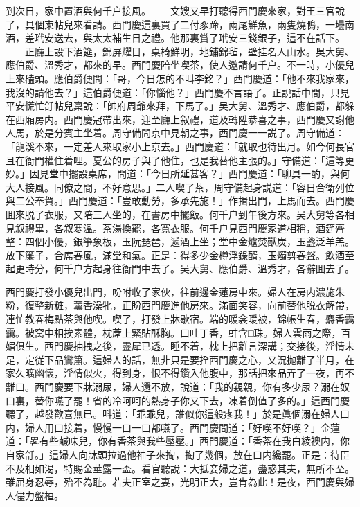 到次日，家中置酒與何千户接風。——文嫂又早打聽得西門慶來家，對王三官說了，具個柬帖兒來看請。西門慶這裏買了二付豕蹄，兩尾鮮魚，兩隻燒鴨，一壜南酒，差玳安送去，與太太補生日之禮。他那裏賞了玳安三錢銀子，這不在話下。——正廳上設下酒筵，錦屏耀目，桌椅鮮明，地鋪錦毡，壁挂名人山水。吳大舅、應伯爵、溫秀才，都來的早。西門慶陪坐喫茶，使人邀請何千户。不一時，小優兒上來磕頭。應伯爵便問：「哥，今日怎的不叫李銘？」西門慶道：「他不來我家來，我沒的請他去？」這伯爵便道：「你惱他？」西門慶不言語了。正說話中間，只見平安慌忙㧱帖兒稟說：「帥府周爺來拜，下馬了。」吴大舅、溫秀才、應伯爵，都躲在西廂房内。西門慶冠帶出來，迎至廳上叙禮，道及轉陞恭喜之事，西門慶又謝他人馬，於是分賓主坐着。周守備問京中見朝之事，西門慶一一説了。周守備道：「龍溪不來，一定差人來取家小上京去。」西門慶道：「就取也待出月。如今何長官且在衙門權住着哩。夏公的房子與了他住，也是我替他主張的。」守備道：「這等更妙。」因見堂中擺設桌席，問道：「今日所延甚客？」西門慶道：「聊具一酌，與何大人接風。同僚之間，不好意思。」二人喫了茶，周守備起身説道：「容日合衛列位與二公奉賀。」西門慶道：「豈敢動勞，多承先施！」作揖出門，上馬而去。西門慶囬來脱了衣服，又陪三人坐的，在書房中擺飯。何千户到午後方來。吴大舅等各相見叙禮畢，各叙寒溫。茶湯換罷，各寬衣服。何千户見西門慶家道相稱，酒筵齊整：四個小優，銀箏象板，玉阮琵琶，遞酒上坐；堂中金爐焚獸炭，玉盞泛羊羔。放下簾子，合席春風，滿堂和氣。正是：得多少金樽浮錄醑，玉燭剪春聲。飲酒至起更時分，何千户方起身往衙門中去了。吴大舅、應伯爵、溫秀才，各辭囬去了。

西門慶打發小優兒出門，吩咐收了家伙，往前邊金蓮房中來。婦人在房内濃施朱粉，復整新粧，薰香澡牝，正盼西門慶進他房來。滿面笑容，向前替他脱衣解帶，連忙教春梅點茶與他喫。喫了，打發上牀歇宿。端的暖衾暖被，錦帳生春，麝香靄靄。被窝中相挨素體，枕蓆上緊貼酥胸。口吐丁香，蚌含□珠。婦人雲雨之際，百媚俱生。西門慶抽拽之後，靈犀已透。睡不着，枕上把離言深講；交接後，淫情未足，定従下品鸞簫。這婦人的話，無非只是要拴西門慶之心，又況抛離了半月，在家久曠幽懷，淫情似火，得到身，恨不得鑽入他腹中，那話把來品弄了一夜，再不離口。西門慶要下牀溺尿，婦人還不放，說道：「我的親親，你有多少尿？溺在奴口裏，替你嚥了罷！省的冷呵呵的熱身子你又下去，凍着倒值了多的。」這西門慶聽了，越發歡喜無已。呌道：「乖乖兒，誰似你這般疼我！」於是眞個溺在婦人口内，婦人用口接着，慢慢一口一口都嚥了。西門慶問道：「好喫不好喫？」金蓮道：「畧有些鹹味兒，你有香茶與我些壓壓。」西門慶道：「香茶在我白綾襖内，你自家㧱。」這婦人向牀頭拉過他袖子來掏，掏了幾個，放在口内纔罷。正是：待臣不及相如渴，特賜金莖露一盃。看官聽說：大抵妾婦之道，蠱惑其夫，無所不至。雖屈身忍辱，殆不為耻。若夫正室之妻，光明正大，豈肯為此！是夜，西門慶與婦人儘力盤桓。

